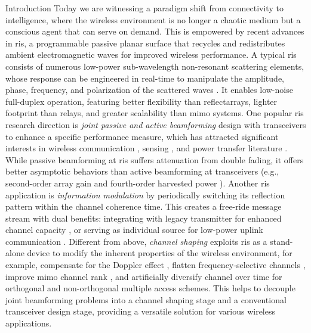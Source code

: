\documentclass[journal]{IEEEtran}
\begin{document}
\begin{section}{Introduction}
		Today we are witnessing a paradigm shift from connectivity to intelligence, where the wireless environment is no longer a chaotic medium but a conscious agent that can serve on demand.
		This is empowered by recent advances in \gls{ris}, a programmable passive planar surface that recycles and redistributes ambient electromagnetic waves for improved wireless performance.
		A typical \gls{ris} consists of numerous low-power sub-wavelength non-resonant scattering elements, whose response can be engineered in real-time to manipulate the amplitude, phase, frequency, and polarization of the scattered waves \cite{Basar2019}.
		It enables low-noise full-duplex operation, featuring better flexibility than reflectarrays, lighter footprint than relays, and greater scalability than \gls{mimo} systems.
		One popular \gls{ris} research direction is \emph{joint passive and active beamforming} design with transceivers to enhance a specific performance measure, which has attracted significant interests in wireless communication \cite{Wu2019,Guo2020,Liu2022}, sensing \cite{He2022,Luo2022,Hua2023}, and power transfer literature \cite{Wu2020a,Feng2022,Zhao2022}.
		While passive beamforming at \gls{ris} suffers attenuation from double fading, it offers better asymptotic behaviors than active beamforming at transceivers (e.g., second-order array gain and fourth-order harvested power \cite{Zhao2022}).
		Another \gls{ris} application is \emph{information modulation} by periodically switching its reflection pattern within the channel coherence time.
		This creates a free-ride message stream with dual benefits: integrating with legacy transmitter for enhanced channel capacity \cite{Karasik2020,Basar2020,Ye2022}, or serving as individual source for low-power uplink communication \cite{Liang2020,Zhao2024,Yang2024}.
		Different from above, \emph{channel shaping} exploits \gls{ris} as a stand-alone device to modify the inherent properties of the wireless environment, for example, compensate for the Doppler effect \cite{Basar2021}, flatten frequency-selective channels \cite{Arslan2022}, improve \gls{mimo} channel rank \cite{Ozdogan2020a}, and artificially diversify channel over time for orthogonal \cite{Yang2019} and non-orthogonal \cite{Chen2023} multiple access schemes.
		This helps to decouple joint beamforming problems into a channel shaping stage and a conventional transceiver design stage, providing a versatile solution for various wireless applications.


\end{section}
\end{document}
